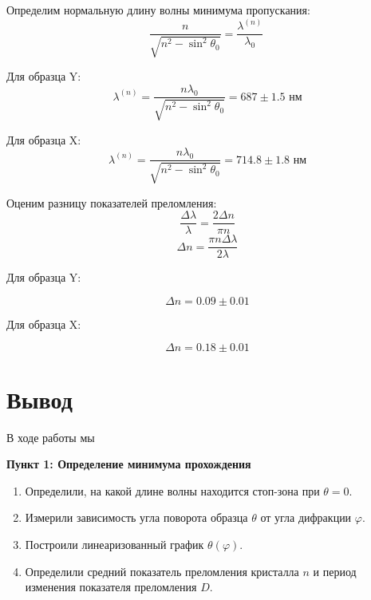 \documentclass[a4paper, 12pt]{article}
\renewcommand{\phi}{\varphi} %
\begin{document}
Определим нормальную длину волны минимума пропускания:
\begin{equation}
\frac {n} {\sqrt{n^2 -\sin^2\theta_0}} = \frac{\lambda^{(n)}}{\lambda_0}\
\label{eq:3}
\end{equation}

Для образца Y:
\begin{equation}
\lambda^{(n)} = \frac {n\lambda_0} {\sqrt{n^2 -\sin^2\theta_0}} = 687 \pm1.5 \text{ нм}
\end{equation}

Для образца X:
\begin{equation}
\lambda^{(n)} = \frac {n\lambda_0} {\sqrt{n^2 -\sin^2\theta_0}} = 714.8  \pm 1.8 \text{ нм}
\end{equation}

Оценим разницу показателей преломления:
\begin{equation}
\frac {\Delta \lambda}{\lambda}=\frac{2\Delta n} {\pi n}
\end{equation}
\begin{equation}
\Delta n = \frac {\pi n\Delta \lambda}{2 \lambda}
\end{equation}

Для образца Y:

\begin{equation}
\Delta n = 0.09\pm0.01
\end{equation}

Для образца X:

\begin{equation}
\Delta n = 0.18\pm0.01
\end{equation}

\section{Вывод}

В ходе работы мы

\textbf{Пункт 1: Определение минимума прохождения}
	\begin{enumerate}
\item Определили, на какой длине волны находится стоп-зона при $\theta=0$.
\item  Измерили зависимость угла поворота образца $\theta$ от угла дифракции $\phi$.
\item  Построили линеаризованный график $\theta(\phi)$.
\item  Определили средний показатель преломления кристалла $n$ и период изменения показателя преломления $D$.
	\end{enumerate}
\end{document}
